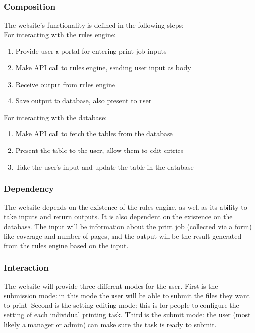 \documentclass[draftclsnofoot,onecolumn,10pt,compsoc]{IEEEtran}
\begin{document}
\subsubsection{Composition}
The website's functionality is defined in the following steps:\\
For interacting with the rules engine:
\begin{enumerate}
  \item Provide user a portal for entering print job inputs
  \item Make API call to rules engine, sending user input as body
  \item Receive output from rules engine
  \item Save output to database, also present to user
\end{enumerate}

For interacting with the database:
\begin{enumerate}
    \item Make API call to fetch the tables from the database
    \item Present the table to the user, allow them to edit entries
    \item Take the user's input and update the table in the database
\end{enumerate}

\subsubsection{Dependency}
The website depends on the existence of the rules engine, as well as its ability to take inputs and return outputs. It is also dependent on the existence on the database. The input will be information about the print job (collected via a form) like coverage and number of pages, and the output will be the result generated from the rules engine based on the input. 

\subsubsection{Interaction}
The website will provide three different modes for the user. First is the submission mode: in this mode the user will be able to submit the files they want to print. Second is the setting editing mode: this is for people to configure the setting of each individual printing task. Third is the submit mode: the user (most likely a manager or admin) can make sure the task is ready to submit.
\end{document}
